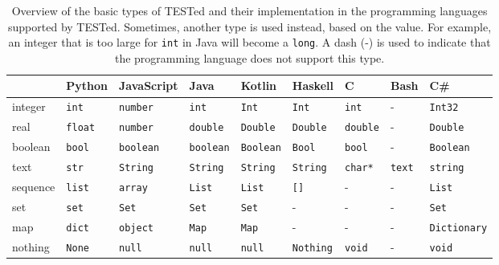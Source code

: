 \documentclass[../main]{subfiles}
\begin{document}
\begin{table}
    \caption{
        Overview of the basic types of TESTed and their implementation in the programming languages supported by TESTed.
        Sometimes, another type is used instead, based on the value. For example, an integer that is too large for \texttt{int} in Java will become a \texttt{long}.
        A dash (-) is used to indicate that the programming language does not support this type.
    }
    \label{tab:tested-basic-types}
    \begin{wide}
        \small\setlength{\tabcolsep}{0.25\tabcolsep}%
        \begin{tabular}{|l|l|l|l|l|l|l|l|l|}
            \hline
            \tested{} & Python         & JavaScript       & Java             & Kotlin           & Haskell          & C               & Bash          & C\#                 \\
            \hline
            integer   & \texttt{int}   & \texttt{number}  & \texttt{int}     & \texttt{Int}     & \texttt{Int}     & \texttt{int}    & -             & \texttt{Int32}      \\
            real      & \texttt{float} & \texttt{number}  & \texttt{double}  & \texttt{Double}  & \texttt{Double}  & \texttt{double} & -             & \texttt{Double}     \\
            boolean   & \texttt{bool}  & \texttt{boolean} & \texttt{boolean} & \texttt{Boolean} & \texttt{Bool}    & \texttt{bool}   & -             & \texttt{Boolean}    \\
            text      & \texttt{str}   & \texttt{String}  & \texttt{String}  & \texttt{String}  & \texttt{String}  & \texttt{char*}  & \texttt{text} & \texttt{string}     \\
            sequence  & \texttt{list}  & \texttt{array}   & \texttt{List}    & \texttt{List}    & \texttt{{[}{]}}  & -               & -             & \texttt{List}       \\
            set       & \texttt{set}   & \texttt{Set}     & \texttt{Set}     & \texttt{Set}     & -                & -               & -             & \texttt{Set}        \\
            map       & \texttt{dict}  & \texttt{object}  & \texttt{Map}     & \texttt{Map}     & -                & -               & -             & \texttt{Dictionary} \\
            nothing   & \texttt{None}  & \texttt{null}    & \texttt{null}    & \texttt{null}    & \texttt{Nothing} & \texttt{void}   & -             & \texttt{void}       \\
            \hline
        \end{tabular}
    \end{wide}
\end{table}
\end{document}
